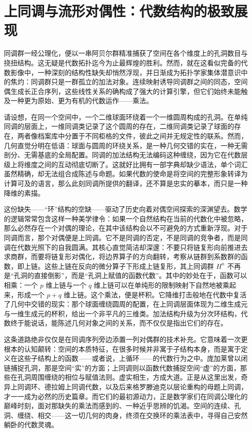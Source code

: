 \documentclass[12pt,a4paper]{article}
\begin{document}
\section{上同调与流形对偶性：代数结构的极致展现}

同调群一经公理化，便以一串阿贝尔群精准捕获了空间在各个维度上的孔洞数目与挠扭结构。这无疑是代数拓扑迄今为止最辉煌的胜利。然而，就在这看似完备的代数影像中，一种深刻的结构性缺失却悄然浮现，并日渐成为拓扑学家集体潜意识中的焦灼：同调群只是一群孤立的加法对象。连续映射诱导同调群之间的同态，空间偶生成长正合序列，这些线性关系的确构成了强大的计算引擎，但它们始终未能触及一种更为原始、更为有机的代数运作——乘法。

请设想，在同一个空间中，一个二维球面环绕着一个一维圆周构成的孔洞。在单纯同调的层面上，一维同调类记录了这个圆周的存在，二维同调类记录了球面的存在，两者像档案库中分置于不同柜格的文件，彼此之间并无规定性的联系。然而，几何直觉分明在低语：球面与圆周的环绕关系，是一种几何交错的实在，一种无需剖分、无需基底的全局配置。同调的加法结构无法编码这种缠绕，因为它在代数层级上将维度之间的互动彻底切断了。这就好比拥有一部字典却缺少语法，单个词汇虽然精确，却无法组合成陈述与命题。如果代数的使命是将空间的完整形象转译为计算可及的语言，那么此刻同调所提供的翻译，还不算是忠实的摹本，而只是一种降维的素描。

这份缺失——“环”结构的空缺——驱动了历史向着对偶空间探索的深渊望去。数学的逻辑常常包含这样一种美学律令：如果一个自然结构在当前的代数化中被忽略，那么必然存在一个对偶的理论，在其中该结构会以不可避免的方式重新浮现。对于同调而言，那个对偶便是上同调。它不是同调的否定，不是同调的竞争者，而是同调在代数光照下的自我圆满。其核心直觉简洁却深邃：不要只将链复形向前推进去求商群，而要将链复形对偶化，将边界算子的方向翻转，考察从链群到系数群的函数，即上链。这些上链在反向的微分算子下形成上链复形，其上同调群 $H^n$ 不再是“孔洞的直接倒影”，而是“孔洞上赋值的函数代数”。其中的妙处在于，函数可以相乘：一个 $p$ 维上链与一个 $q$ 维上链可以在单纯形的限制映射下自然地被乘起来，形成一个 $p+q$ 维上链。这个乘法，便是杯积。它降维打击般地在代数中复活了几何中交错的现实：那个球面缠绕圆周的配置，在上同调层面体现为二维生成元与一维生成元的杯积，给出一个非平凡的三维类。加法结构升级为分次环结构，代数终于能说话，能陈述几何对象之间的关系，而不仅仅是指出它们的存在。

这条道路绝非仅仅是在同调序列旁边添置一列对偶群的技术补充。它意味着一次更根本的认知颠转：空间的本质特征，在很多时候并非寓于子结构本身，而是寓于定义在这些子结构上的函数——或者说，上循环——的代数行为之中。庞加莱曾以闭链捕捉孔洞，那是空间“实”的方面；上同调则以函数代数捕捉空间“虚”的方面，那些在孔洞周围缠绕的相位与赋值法则。虚实相生，方成大道。正是从这里出发，奇异上同调环、德拉姆上同调代数，以及后来格罗滕迪克以层论重构的母题上同调，才一一成为必然的历史篇章。而它们的最初源动力，正是数学家们在同调公理化的巅峰时刻，面对那缺失的乘法而感到的、一种近乎思辨的饥渴。空间的连续、孔洞、缠绕、相交——这一切几何的肉身，终须在交换环的乘法表中，寻得自己安然躺卧的代数灵魂。
\end{document}
